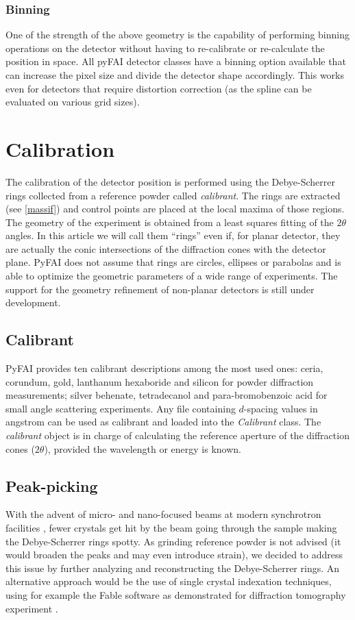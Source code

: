 \documentclass[preprint]{iucr}
\begin{document}
\subsubsection{Binning}
One of the strength of the above geometry is the capability of performing
binning operations on the detector without having to re-calibrate or
re-calculate the position in space.
All pyFAI detector classes have a binning option available that can increase the
pixel size and divide the detector shape accordingly.
This works even for detectors that require distortion correction (as the spline can be
evaluated on various grid sizes).

\section{Calibration}

The calibration of the detector position is performed using the Debye-Scherrer
rings collected from a reference powder called \textit{calibrant}.
The rings are extracted (see \ref{massif}) and control points are placed at the
local maxima of those regions.
The geometry of the experiment is obtained from a least squares fitting of
the $2\theta$ angles.
In this article we will call them ``rings'' even if, for planar detector,
they are actually the conic intersections of the diffraction cones
with the detector plane.
PyFAI does not assume that rings are circles, ellipses or parabolas and is able
to optimize the geometric parameters of a wide range of experiments.
The support for the geometry refinement of non-planar detectors is still under
development.

\subsection{Calibrant}
PyFAI provides ten calibrant descriptions among the most used ones: ceria,
corundum, gold, lanthanum hexaboride and silicon for powder diffraction
measurements; silver behenate, tetradecanol and para-bromobenzoic acid for small
angle scattering experiments.
Any file containing $d$-spacing values in angstrom can be used as calibrant and
loaded into the \textit{Calibrant} class.
The \textit{calibrant} object is in charge of
calculating the reference aperture of the diffraction cones ($2\theta$),
provided the wavelength or energy is known.

\subsection{Peak-picking}
With the advent of micro- and nano-focused beams at modern synchrotron
facilities \cite{id13}, fewer crystals get hit by the beam going through the
sample making the Debye-Scherrer rings spotty.
As grinding reference powder is not advised (it would broaden the peaks
and may even introduce strain), we decided to
address this issue by further analyzing and reconstructing the Debye-Scherrer rings.
An alternative approach would be the use of single crystal indexation techniques, using
for example the Fable software \cite{fable} as demonstrated for diffraction
tomography experiment \cite{bonnin}.
\end{document}
